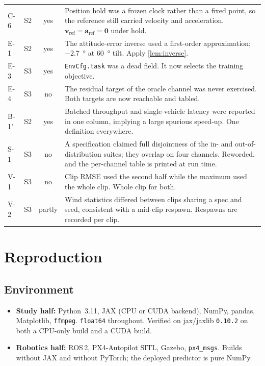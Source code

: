 \documentclass[11pt,a4paper,twoside,openright]{report}
\renewcommand{\vec}[1]{\bm{#1}}
\newcommand{\refsym}{\mathrm{ref}}
\theoremstyle{plain}
\theoremstyle{definition}
\theoremstyle{remark}
\begin{document}
\begin{table}[htbp]
\begin{tabularx}{\linewidth}{@{}l c c X@{}}
			C-6 & S2 & yes & Position hold was a frozen clock rather than a fixed point, so the reference still carried velocity and acceleration. $\vec v_\refsym=\vec a_\refsym=\vec 0$ under hold. \\
			E-1 & S2 & yes & The attitude-error inverse used a first-order approximation; \SI{-2.7}{\degree} at \SI{60}{\degree} tilt. Apply \cref{lem:inverse}. \\
			E-3 & S3 & yes & \texttt{EnvCfg.task} was a dead field. It now selects the training objective. \\
			E-4 & S3 & no & The residual target of the oracle channel was never exercised. Both targets are now reachable and tabled. \\
			B-1' & S2 & yes & Batched throughput and single-vehicle latency were reported in one column, implying a large spurious speed-up. One definition everywhere. \\
			S-1 & S3 & no & A specification claimed full disjointness of the in- and out-of-distribution suites; they overlap on four channels. Reworded, and the per-channel table is printed at run time. \\
			V-1 & S3 & no & Clip RMSE used the second half while the maximum used the whole clip. Whole clip for both. \\
			V-2 & S3 & partly & Wind statistics differed between clips sharing a spec and seed, consistent with a mid-clip respawn. Respawns are recorded per clip. \\
			\bottomrule
		\end{tabularx}
	\end{table}

	\chapter{Reproduction}
	\label{app:repro}

	\section{Environment}

	\begin{itemize}[nosep]
		\item \textbf{Study half:} Python~3.11, JAX (CPU or CUDA backend), NumPy,
		pandas, Matplotlib, \texttt{ffmpeg}. \texttt{float64} throughout. Verified on
		jax/jaxlib \texttt{0.10.2} on both a CPU-only build and a CUDA build.
		\item \textbf{Robotics half:} ROS\,2, PX4-Autopilot SITL, Gazebo,
		\texttt{px4\_msgs}. Builds without JAX and without PyTorch; the deployed
		predictor is pure NumPy.
	\end{itemize}
\end{document}
